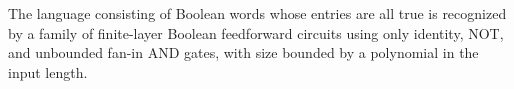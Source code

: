 \begin{theorem}
\label{Language.allOnes_inLayeredPPoly}
\leanok
{}
The language consisting of Boolean words whose entries are all true is recognized by a
family of finite-layer Boolean feedforward circuits using only identity, NOT, and
unbounded fan-in AND gates, with size bounded by a polynomial in the input length.
\end{theorem}
